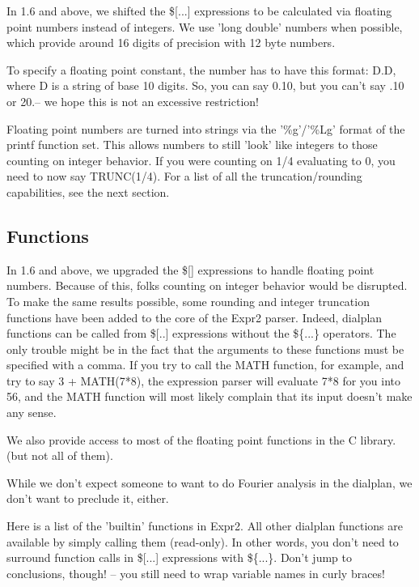 In 1.6 and above, we shifted the \$[...] expressions to be calculated
via floating point numbers instead of integers. We use 'long double' numbers
when possible, which provide around 16 digits of precision with 12 byte numbers.

To specify a floating point constant, the number has to have this format: D.D, where D is
a string of base 10 digits. So, you can say 0.10, but you can't say .10 or 20.-- we hope
this is not an excessive restriction!

Floating point numbers are turned into strings via the '\%g'/'\%Lg' format of the printf
function set. This allows numbers to still 'look' like integers to those counting
on integer behavior. If you were counting on 1/4 evaluating to 0, you need to now say
TRUNC(1/4). For a list of all the truncation/rounding capabilities, see the next section.


\subsection{Functions}

In 1.6 and above, we upgraded the \$[] expressions to handle floating point numbers.
Because of this, folks counting on integer behavior would be disrupted. To make
the same results possible, some rounding and integer truncation functions have been
added to the core of the Expr2 parser. Indeed, dialplan functions can be called from
\$[..] expressions without the \$\{...\} operators. The only trouble might be in the fact that
the arguments to these functions must be specified with a comma. If you try to call
the MATH function, for example, and try to say 3 + MATH(7*8), the expression parser will
evaluate 7*8 for you into 56, and the MATH function will most likely complain that its
input doesn't make any sense.

We also provide access to most of the floating point functions in the C library. (but not all of them).

While we don't expect someone to want to do Fourier analysis in the dialplan, we
don't want to preclude it, either.

Here is a list of the 'builtin' functions in Expr2. All other dialplan functions
are available by simply calling them (read-only). In other words, you don't need to
surround function calls in \$[...] expressions with \$\{...\}. Don't jump to conclusions,
though! -- you still need to wrap variable names in curly braces!

